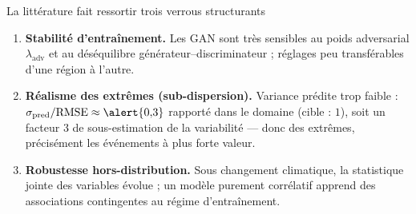 \documentclass[aspectratio=169,10pt]{beamer}
\begin{document}
\begin{frame}{La littérature fait ressortir trois verrous structurants}
  \begin{enumerate}
    \item \textbf{Stabilité d'entraînement.} Les GAN sont très sensibles au poids
          adversarial $\lambda_{\mathrm{adv}}$ et au déséquilibre générateur--discriminateur ;
          réglages peu transférables d'une région à l'autre.
    \item \textbf{Réalisme des extrêmes (sub-dispersion).} Variance prédite trop faible :
          $\sigma_{\mathrm{pred}}/\mathrm{RMSE} \approx \alert{0{,}3}$ rapporté dans le domaine
          (cible : $1$), soit un facteur 3 de sous-estimation de la variabilité ---
          donc des extrêmes, précisément les événements à plus forte valeur.
    \item \textbf{Robustesse hors-distribution.} Sous changement climatique, la statistique
          jointe des variables évolue ; un modèle purement corrélatif apprend des
          associations contingentes au régime d'entraînement.
  \end{enumerate}
\end{frame}
\end{document}

